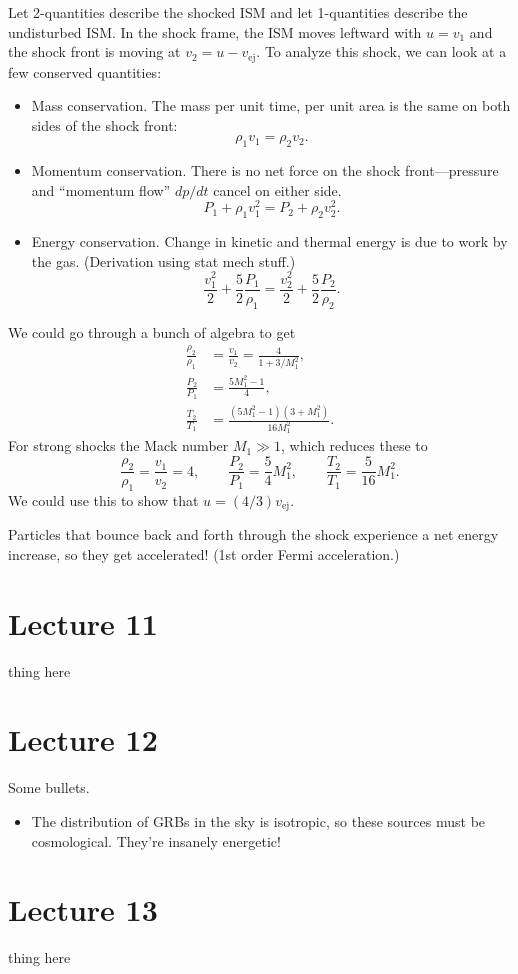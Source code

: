 \documentclass[../a122main.tex]{subfiles}
\begin{document}
Let 2-quantities describe the shocked ISM and let 1-quantities describe the undisturbed ISM.
In the shock frame, the ISM moves leftward with $u = v_1$ and the shock front is moving at $v_2 = u - v_\text{ej}$.
To analyze this shock, we can look at a few conserved quantities:
\begin{itemize}[topsep=0pt]
    \item Mass conservation.
    The mass per unit time, per unit area is the same on both sides of the shock front:
    \[ \rho_1 v_1 = \rho_2 v_2. \]
    \item Momentum conservation.
    There is no net force on the shock front---pressure and ``momentum flow'' $dp / dt$ cancel on either side.
    \[ P_1 + \rho_1 v_1^2 = P_2 + \rho_2 v_2^2. \]
    \item Energy conservation.
    Change in kinetic and thermal energy is due to work by the gas.
    (Derivation using stat mech stuff.)
    \[ \frac{v_1^2}{2} + \frac{5}{2} \frac{P_1}{\rho_1} = \frac{v_2^2}{2} + \frac{5}{2} \frac{P_2}{\rho_2}. \]
\end{itemize}
We could go through a bunch of algebra to get
\begin{align*}
    \frac{\rho_2}{\rho_1} &= \frac{v_1}{v_2} = \frac{4}{1 + 3 / M_1^2}, \\
    \frac{P_2}{P_1} &= \frac{5M_1^2 - 1}{4}, \\
    \frac{T_2}{T_1} &= \frac{(5 M_1^2 - 1) (3 + M_1^2)}{16M_1^2}.
\end{align*}
For strong shocks the Mack number $M_1 \gg 1$, which reduces these to
\[ \frac{\rho_2}{\rho_1} = \frac{v_1}{v_2} = 4, \qquad \frac{P_2}{P_1} = \frac{5}{4} M_1^2, \qquad \frac{T_2}{T_1} = \frac{5}{16} M_1^2. \]
We could use this to show that $u = (4 / 3) v_\textrm{ej}$.

Particles that bounce back and forth through the shock experience a net energy increase, so they get accelerated!
(1st order Fermi acceleration.)

\section{Lecture 11}
thing here

\section{Lecture 12}
Some bullets.
\begin{itemize}[topsep=0pt]
    \item The distribution of GRBs in the sky is isotropic, so these sources must be cosmological.
    They're insanely energetic!
\end{itemize}

\section{Lecture 13}
thing here
\end{document}
